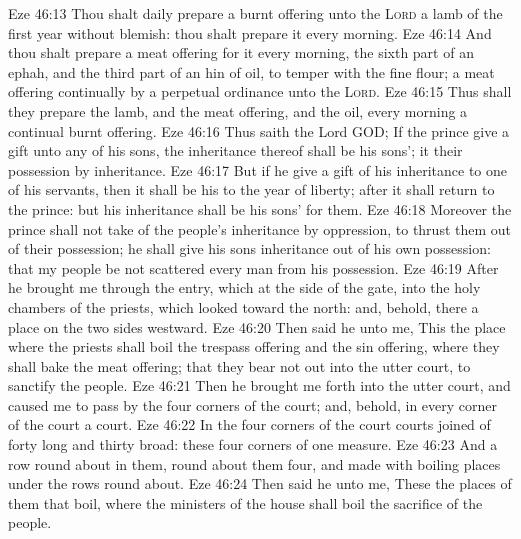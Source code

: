 \vs Eze 46:13 Thou shalt daily prepare a burnt offering unto the \textsc{Lord}  a lamb of the first year without blemish: thou shalt prepare it every morning.
\vs Eze 46:14 And thou shalt prepare a meat offering for it every morning, the sixth part of an ephah, and the third part of an hin of oil, to temper with the fine flour; a meat offering continually by a perpetual ordinance unto the \textsc{Lord}.
\vs Eze 46:15 Thus shall they prepare the lamb, and the meat offering, and the oil, every morning  a continual burnt offering.
\vs Eze 46:16 Thus saith the Lord GOD; If the prince give a gift unto any of his sons, the inheritance thereof shall be his sons'; it  their possession by inheritance.
\vs Eze 46:17 But if he give a gift of his inheritance to one of his servants, then it shall be his to the year of liberty; after it shall return to the prince: but his inheritance shall be his sons' for them.
\vs Eze 46:18 Moreover the prince shall not take of the people's inheritance by oppression, to thrust them out of their possession;  he shall give his sons inheritance out of his own possession: that my people be not scattered every man from his possession.
\vs Eze 46:19 After he brought me through the entry, which  at the side of the gate, into the holy chambers of the priests, which looked toward the north: and, behold, there  a place on the two sides westward.
\vs Eze 46:20 Then said he unto me, This  the place where the priests shall boil the trespass offering and the sin offering, where they shall bake the meat offering; that they bear  not out into the utter court, to sanctify the people.
\vs Eze 46:21 Then he brought me forth into the utter court, and caused me to pass by the four corners of the court; and, behold, in every corner of the court  a court.
\vs Eze 46:22 In the four corners of the court  courts joined of forty  long and thirty broad: these four corners  of one measure.
\vs Eze 46:23 And  a row  round about in them, round about them four, and  made with boiling places under the rows round about.
\vs Eze 46:24 Then said he unto me, These  the places of them that boil, where the ministers of the house shall boil the sacrifice of the people.
